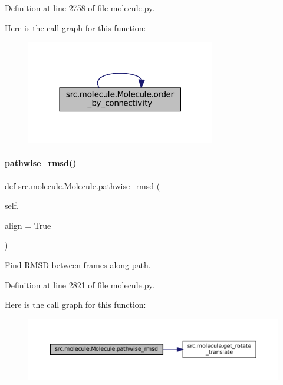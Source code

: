 Definition at line 2758 of file molecule.\+py.

Here is the call graph for this function\+:
\nopagebreak
\begin{figure}[H]
\begin{center}
\leavevmode
\includegraphics[width=234pt]{classsrc_1_1molecule_1_1Molecule_a5aac5225e3c6c540659410f7a783cd99_cgraph}
\end{center}
\end{figure}
\mbox{\label{classsrc_1_1molecule_1_1Molecule_af1fbd83fc5bba35b5df496413410f84d}} 
\paragraph{\texorpdfstring{pathwise\+\_\+rmsd()}{pathwise\_rmsd()}}
{\footnotesize\ttfamily def src.\+molecule.\+Molecule.\+pathwise\+\_\+rmsd (\begin{DoxyParamCaption}\item[{}]{self,  }\item[{}]{align = {\ttfamily True} }\end{DoxyParamCaption})}



Find R\+M\+SD between frames along path. 



Definition at line 2821 of file molecule.\+py.

Here is the call graph for this function\+:
\nopagebreak
\begin{figure}[H]
\begin{center}
\leavevmode
\includegraphics[width=350pt]{classsrc_1_1molecule_1_1Molecule_af1fbd83fc5bba35b5df496413410f84d_cgraph}
\end{center}
\end{figure}
\mbox{\label{classsrc_1_1molecule_1_1Molecule_a972ec8931555662db70e0f6acaa009ca}} 
